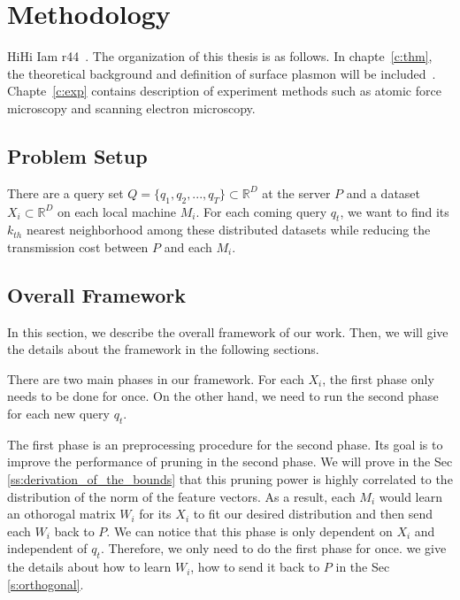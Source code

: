 \chapter{Methodology}
\label{c:method}

HiHi Iam r44~. The organization of this thesis is as follows. In chapte~\ref{c:thm}, the theoretical background and definition of surface plasmon will be included~\cite{maier2007plasmonics}. Chapte~\ref{c:exp} contains description of experiment methods such as atomic force microscopy and scanning electron microscopy. 

\section{Problem Setup}
\label{s:probsetup}
There are a query set $Q={\{q_1,q_2,...,q_T\}}\subset\mathbb{R}^D$ at the server $P$ and a dataset $X_i\subset\mathbb{R}^D$ on each local machine $M_i$.  For each coming query $q_t$, we want to find its $k_{th}$ nearest neighborhood among these distributed datasets while reducing the transmission cost between $P$ and each $M_i$.

\section{Overall Framework}
\label{s:overall}
In this section, we describe the overall framework of our work.  Then, we will give the details about the framework in the following sections.

There are two main phases in our framework.  For each $X_i$, the first phase only needs to be done for once.  On the other hand, we need to run the second phase for each new query $q_t$.

The first phase is an preprocessing procedure for the second phase. Its goal is to improve the performance of pruning in the second phase.  We will prove in the Sec \ref{ss:derivation_of_the_bounds} that this pruning power is highly correlated to the distribution of the norm of the feature vectors. As a result, each $M_i$ would learn an othorogal matrix $W_i$ for its $X_i$ to fit our desired distribution and then send each $W_i$ back to $P$.  We can notice that this phase is only dependent on $X_i$ and independent of $q_t$.  Therefore, we only need to do the first phase for once.  we give the details about how to learn $W_i$, how to send it back to $P$ in the Sec \ref{s:orthogonal}.

